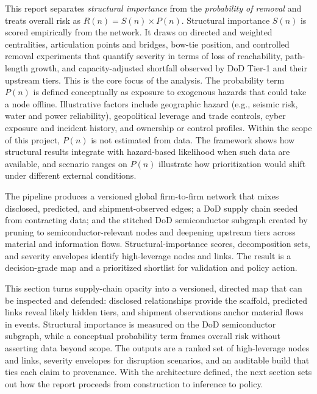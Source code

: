 This report separates \emph{structural importance} from the \emph{probability of removal} and treats overall risk as \(R(n)=S(n)\times P(n)\). Structural importance \(S(n)\) is scored empirically from the network. It draws on directed and weighted centralities, articulation points and bridges, bow-tie position, and controlled removal experiments that quantify severity in terms of loss of reachability, path-length growth, and capacity-adjusted shortfall observed by DoD Tier-1 and their upstream tiers. This is the core focus of the analysis. The probability term \(P(n)\) is defined conceptually as exposure to exogenous hazards that could take a node offline. Illustrative factors include geographic hazard (e.g., seismic risk, water and power reliability), geopolitical leverage and trade controls, cyber exposure and incident history, and ownership or control profiles. Within the scope of this project, \(P(n)\) is not estimated from data. The framework shows how structural results integrate with hazard-based likelihood when such data are available, and scenario ranges on \(P(n)\) illustrate how prioritization would shift under different external conditions.

The pipeline produces a versioned global firm-to-firm network that mixes disclosed, predicted, and shipment-observed edges; a DoD supply chain seeded from contracting data; and the stitched DoD semiconductor subgraph created by pruning to semiconductor-relevant nodes and deepening upstream tiers across material and information flows. Structural-importance scores, decomposition sets, and severity envelopes identify high-leverage nodes and links. The result is a decision-grade map and a prioritized shortlist for validation and policy action.

This section turns supply-chain opacity into a versioned, directed map that can be inspected and defended: disclosed relationships provide the scaffold, predicted links reveal likely hidden tiers, and shipment observations anchor material flows in events. Structural importance is measured on the DoD semiconductor subgraph, while a conceptual probability term frames overall risk without asserting data beyond scope. The outputs are a ranked set of high-leverage nodes and links, severity envelopes for disruption scenarios, and an auditable build that ties each claim to provenance. With the architecture defined, the next section sets out how the report proceeds from construction to inference to policy.

